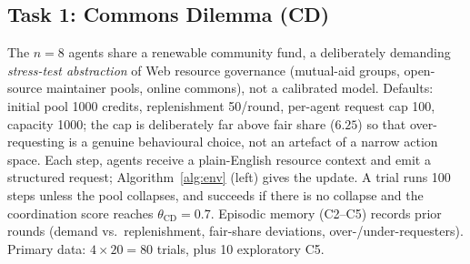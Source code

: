 \documentclass[runningheads]{llncs}
\begin{document}
\subsection{Task 1: Commons Dilemma (CD)}
The $n=8$ agents share a renewable community fund, a deliberately demanding \emph{stress-test
abstraction} of Web resource governance (mutual-aid groups, open-source maintainer pools, online
commons), not a calibrated model. Defaults: initial pool 1000 credits, replenishment 50/round,
per-agent request cap 100, capacity 1000; the cap is deliberately far above fair share ($6.25$) so
that over-requesting is a genuine behavioural choice, not an artefact of a narrow action space.
Each step, agents receive a plain-English resource
context and emit a structured request; Algorithm~\ref{alg:env} (left) gives the update. A trial
runs 100 steps unless the pool collapses, and succeeds if there is no collapse and the coordination
score reaches $\theta_{\mathrm{CD}}=0.7$. Episodic memory (C2--C5) records prior rounds (demand
vs.\ replenishment, fair-share deviations, over-/under-requesters). Primary data: $4\times20=80$
trials, plus 10 exploratory C5.
\end{document}
